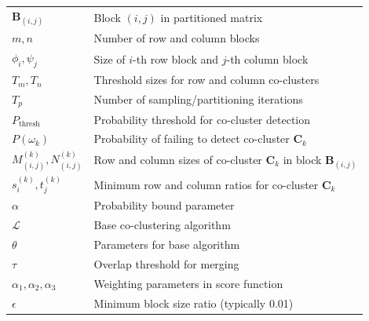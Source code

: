 \documentclass[journal]{IEEEtran}
\theoremstyle{definition}
\theoremstyle{remark} %
\begin{document}
{\begin{table}[htbp]
\begin{tabular}{@{} p{} p{} @{}}
                $\mathbf{B}_{(i,j)}$               & Block $(i,j)$ in partitioned matrix                                             \\
                $m, n$                             & Number of row and column blocks                                                 \\
                $\phi_i, \psi_j$                   & Size of $i$-th row block and $j$-th column block                                \\
                $T_m, T_n$                         & Threshold sizes for row and column co-clusters                                  \\
                $T_p$                              & Number of sampling/partitioning iterations                                      \\
                $P_{\text{thresh}}$                & Probability threshold for co-cluster detection                                  \\
                $P(\omega_k)$                      & Probability of failing to detect co-cluster $\mathbf{C}_k$                      \\
                $M_{(i,j)}^{(k)}, N_{(i,j)}^{(k)}$ & Row and column sizes of co-cluster $\mathbf{C}_k$ in block $\mathbf{B}_{(i,j)}$ \\
                $s_i^{(k)}, t_j^{(k)}$             & Minimum row and column ratios for co-cluster $\mathbf{C}_k$                     \\
                $\alpha$                           & Probability bound parameter                                                     \\
                $\mathcal{L}$                      & Base co-clustering algorithm                                                    \\
                $\theta$                           & Parameters for base algorithm                                                   \\
                $\tau$                             & Overlap threshold for merging                                                   \\
                $\alpha_1, \alpha_2, \alpha_3$     & Weighting parameters in score function                                          \\
                $\epsilon$                         & Minimum block size ratio (typically 0.01)                                       \\

\end{tabular}
\end{table}}
\end{document}
